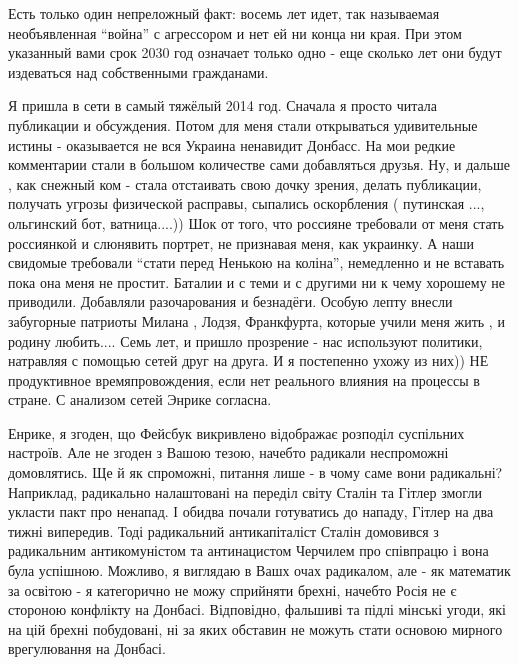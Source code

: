 \begin{itemize}

Есть только один непреложный факт: восемь лет идет, так называемая
необъявленная \enquote{война} с агрессором и нет ей ни конца ни края. При этом указанный
вами срок 2030 год означает только одно - еще сколько лет они будут издеваться
над собственными гражданами.


Я пришла в сети в самый тяжёлый 2014 год. Сначала я просто читала публикации и
обсуждения. Потом для меня стали открываться удивительные истины - оказывается
не вся Украина ненавидит Донбасс. На мои редкие комментарии стали в большом
количестве сами добавляться друзья. Ну, и дальше , как снежный ком - стала
отстаивать свою дочку зрения, делать публикации, получать угрозы физической
расправы, сыпались оскорбления ( путинская ..., ольгинский бот, ватница....))
Шок от того, что россияне требовали от меня стать россиянкой и слюнявить
портрет, не признавая меня, как украинку. А наши свидомые требовали \enquote{стати
перед Ненькою на коліна}, немедленно и не вставать пока она меня не простит.
Баталии и с теми и с другими ни к чему хорошему не приводили. Добавляли
разочарования и безнадёги. Особую лепту внесли забугорные патриоты Милана ,
Лодзя, Франкфурта, которые учили меня жить , и родину любить.... Семь лет, и
пришло прозрение - нас используют политики, натравляя с помощью сетей друг на
друга. И я постепенно ухожу из них)) НЕ продуктивное времяпровождения, если нет
реального влияния на процессы в стране. С анализом сетей Энрике согласна.


Енрике, я згоден, що Фейсбук викривлено відображає розподіл суспільних
настроїв. Але не згоден з Вашою тезою, начебто радикали неспроможні
домовлятись. Ще й як спроможні, питання лише - в чому саме вони радикальні?
Наприклад, радикально налаштовані на переділ світу Сталін та Гітлер змогли
укласти пакт про ненапад. І обидва почали готуватись до нападу, Гітлер на два
тижні випередив. Тоді радикальний антикапіталіст Сталін домовився з радикальним
антикомуністом та антинацистом Черчилем про співпрацю і вона була успішною.
Можливо, я виглядаю в Вашх очах радикалом, але - як математик за освітою - я
категорично не можу сприйняти брехні, начебто Росія не є стороною конфлікту на
Донбасі. Відповідно, фальшиві та підлі мінські угоди, які на цій брехні
побудовані, ні за яких обставин не можуть стати основою мирного врегулювання на
Донбасі.



\end{itemize}
